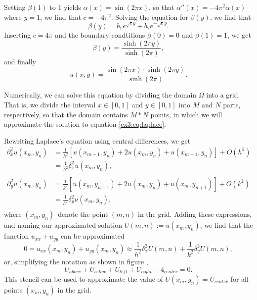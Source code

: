 Setting $\beta(1)$ to $1$ yields $\alpha(x) = \sin(2\pi x)$, so that $\alpha''(x) = -4\pi^2\alpha(x)$ where $y = 1$, we find that $c = -4\pi^2$.
Solving the equation for $\beta(y)$, we find that
\begin{equation*}
    \beta(y) = b_1 e^{\sqrt{c} y} + b_2 e^{-\sqrt{c} y}.
\end{equation*}
Inserting $c = 4\pi$ and the boundary condtitions $\beta(0) = 0$ and $\beta(1) = 1$, we get
\begin{equation*}
    \beta(y) = \frac{\sinh(2\pi y)}{\sinh(2\pi)},
\end{equation*}
and finally
\begin{equation*}
    u(x,y) = \frac{\sin(2\pi x) \cdot \sinh(2\pi y)}{\sinh(2\pi)}.
\end{equation*}

Numerically, we can solve this equation by dividing the domain $\Omega$ into a grid.
That is, we divide the interval $x \in [0,1]$ and $y \in [0,1]$ into $M$ and $N$ parts, respectively, so that the domain contains $M * N$ points, in which we will approximate the solution to equation \ref{ex3:eq:laplace}.

Rewriting Laplace's equation using central differences, we get
\begin{equation*}
    \begin{split}
    \partial^2_x u(x_m, y_n) 
        &= \frac{1}{h^2}[u(x_{m-1},y_n) + 2u(x_m,y_n) + u(x_{m+1},y_n)] + O(h^2)\\
        &= \frac{1}{h^2}\delta^2_x u(x_m,y_n),\\
    \end{split}
\end{equation*}
\begin{equation*}
    \begin{split}
    \partial^2_y u(x_m, y_n) 
        &= \frac{1}{k^2}[u(x_{m},y_{n-1}) + 2u(x_m,y_n) + u(x_{m},y_{n+1})] + O(k^2)\\
        &= \frac{1}{h^2}\delta^2_y u(x_m,y_n),\\
    \end{split}
\end{equation*}
where $(x_m, y_n)$ denote the point $(m,n)$ in the grid. 
Adding these expressions, and naming our approximated solution $U(m,n) := u(x_m,y_n)$, we find that the function $u_{xx} + u_{yy}$ can be approximated 
\begin{equation*}
    0 = u_{xx}(x_m,y_n) + u_{yy}(x_m,y_n)
    \approx \frac{1}{h^2}\delta^2_x U(m,n) + \frac{1}{k^2}\delta^2_y U(m,n),
\end{equation*}
or, simplifying the notation as shown in figure %
,
\begin{equation*}
    U_{above} + U_{below} + U_{left} + U_{right} - 4_{center} = 0.
\end{equation*}
This stencil can be used to approximate the value of $U(x_m, y_n) = U_{center}$ for all points $(x_m, y_n)$ in the grid.
